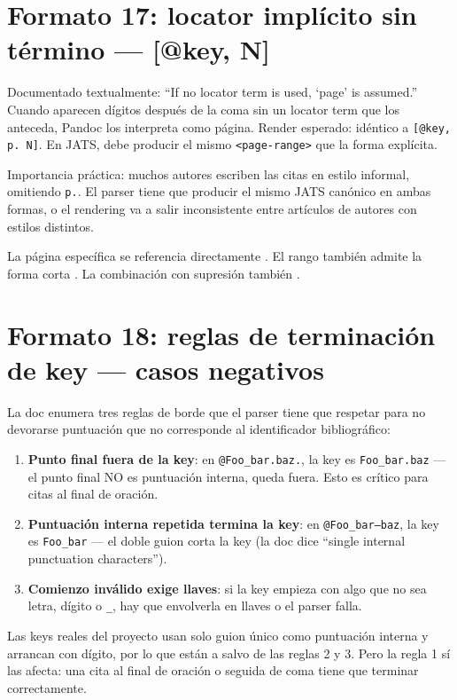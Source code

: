 \section{Formato 17: locator implícito sin término — [@key, N]}
Documentado textualmente: “If no locator term is used, ‘page’ is assumed.” Cuando aparecen dígitos después de la coma sin un locator term que los anteceda, Pandoc los interpreta como página. Render esperado: idéntico a \texttt{[@key, p. N]}. En JATS, debe producir el mismo \texttt{<page-range>} que la forma explícita.

Importancia práctica: muchos autores escriben las citas en estilo informal, omitiendo \texttt{p.}. El parser tiene que producir el mismo JATS canónico en ambas formas, o el rendering va a salir inconsistente entre artículos de autores con estilos distintos.

La página específica se referencia directamente \autocite[p. 33]{2961-KACZAN2016}. El rango también admite la forma corta \autocite[pp. 55-60]{3041-PINEAU1999}. La combinación con supresión también \autocite*[p. 235]{3036-ORBUCH2020}.


\section{Formato 18: reglas de terminación de key — casos negativos}
La doc enumera tres reglas de borde que el parser tiene que respetar para no devorarse puntuación que no corresponde al identificador bibliográfico:

\begin{enumerate}
  \item \textbf{Punto final fuera de la key}: en \texttt{@Foo\_bar.baz.}, la key es \texttt{Foo\_bar.baz} — el punto final NO es puntuación interna, queda fuera. Esto es crítico para citas al final de oración.
  \item \textbf{Puntuación interna repetida termina la key}: en \texttt{@Foo\_bar--baz}, la key es \texttt{Foo\_bar} — el doble guion corta la key (la doc dice “single internal punctuation characters”).
  \item \textbf{Comienzo inválido exige llaves}: si la key empieza con algo que no sea letra, dígito o \texttt{\_}, hay que envolverla en llaves o el parser falla.
\end{enumerate}

Las keys reales del proyecto usan solo guion único como puntuación interna y arrancan con dígito, por lo que están a salvo de las reglas 2 y 3. Pero la regla 1 sí las afecta: una cita al final de oración o seguida de coma tiene que terminar correctamente.

